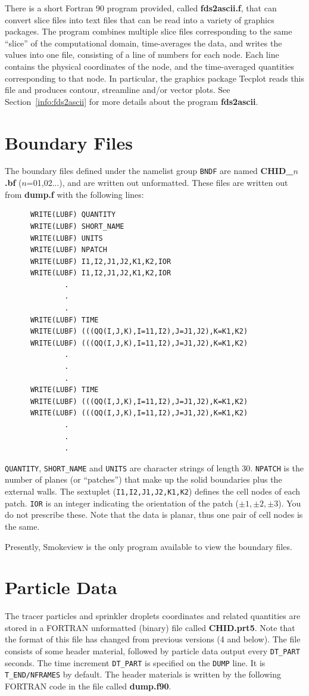 \documentclass[11pt]{book}
\newcommand{\ct}{\tt\small}
\begin{document}
There is a short Fortran 90 program provided, called
{\bf fds2ascii.f},
that can convert slice files into text files that can be read
into a variety of graphics packages. The program combines multiple
slice files corresponding to the same ``slice'' of the computational
domain, time-averages the data, and writes the values into one file,
consisting of a line of numbers for each node. Each line contains the
physical coordinates of the node, and the time-averaged quantities
corresponding to that node. In particular, the graphics package
Tecplot
reads this file and produces contour, streamline and/or vector plots.
See Section~\ref{info:fds2ascii} for more details about the program
{\bf fds2ascii}.

\section{Boundary Files}%
\label{out:BNDF}
The boundary files defined under the namelist group {\ct BNDF} are
named {\bf CHID\_$n$.bf} ($n$=01,02...),
and are written out unformatted.
These files are written out from {\bf dump.f} with the following lines:

\footnotesize
\begin{verbatim}
      WRITE(LUBF) QUANTITY
      WRITE(LUBF) SHORT_NAME
      WRITE(LUBF) UNITS
      WRITE(LUBF) NPATCH
      WRITE(LUBF) I1,I2,J1,J2,K1,K2,IOR
      WRITE(LUBF) I1,I2,J1,J2,K1,K2,IOR
              .
              .
              .
      WRITE(LUBF) TIME
      WRITE(LUBF) (((QQ(I,J,K),I=11,I2),J=J1,J2),K=K1,K2)
      WRITE(LUBF) (((QQ(I,J,K),I=11,I2),J=J1,J2),K=K1,K2)
              .
              .
              .
      WRITE(LUBF) TIME
      WRITE(LUBF) (((QQ(I,J,K),I=11,I2),J=J1,J2),K=K1,K2)
      WRITE(LUBF) (((QQ(I,J,K),I=11,I2),J=J1,J2),K=K1,K2)
              .
              .
              .
\end{verbatim}
\normalsize
{\ct QUANTITY}, {\ct SHORT\_NAME} and {\ct UNITS} are
character strings of length 30.
{\ct NPATCH} is the number of planes (or ``patches'') that make up the
solid boundaries plus the external walls.
The sextuplet ({\ct I1,I2,J1,J2,K1,K2}) defines the cell nodes of each
patch. {\ct IOR} is an integer indicating the orientation of the
patch ($\pm 1,\pm 2,\pm 3$).
You do not prescribe these. Note that the data is planar,
thus one pair of cell nodes is the same.

Presently, Smokeview is the only program available to view the
boundary files.

\section{Particle Data}%
\label{out:PART}
The tracer particles and sprinkler droplets coordinates and related quantities
are stored in a FORTRAN unformatted (binary) file called {\bf CHID.prt5}.
Note that the format of this file has changed from previous versions (4 and below).
The file consists of some header material, followed by particle data output every
{\ct DT\_PART} seconds. The time increment {\ct DT\_PART} is specified on the
{\ct DUMP} line. It is {\ct T\_END/NFRAMES} by default.
The header materials is written by the following FORTRAN code in the file called {\bf dump.f90}.
\end{document}
